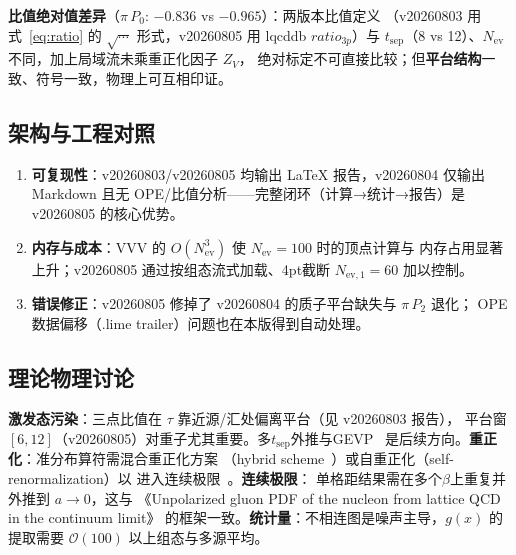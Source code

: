 \documentclass[11pt,a4paper]{article}
\newcommand{\Nev}{N_{\mathrm{ev}}}
\newcommand{\tsep}{t_{\mathrm{sep}}}
\begin{document}
\textbf{比值绝对值差异}（$\pi\,P_0$: $-0.836$ vs $-0.965$）：两版本比值定义
（v20260803 用式~\eqref{eq:ratio} 的 $\sqrt{\cdots}$ 形式，v20260805 用 lqcddb
$ratio_{3p}$）与 $\tsep$（8 vs 12）、$\Nev$ 不同，加上局域流未乘重正化因子 $Z_V$，
绝对标定不可直接比较；但\textbf{平台结构}一致、符号一致，物理上可互相印证。

\subsection{架构与工程对照}
\begin{enumerate}[leftmargin=*]
\item \textbf{可复现性}：v20260803/v20260805 均输出 LaTeX 报告，v20260804 仅输出
      Markdown 且无 OPE/比值分析——完整闭环（计算→统计→报告）是 v20260805 的核心优势。
\item \textbf{内存与成本}：VVV 的 $O(\Nev^3)$ 使 $\Nev=100$ 时的顶点计算与
      内存占用显著上升；v20260805 通过按组态流式加载、4pt截断 $N_{\mathrm{ev},1}=60$ 加以控制。
\item \textbf{错误修正}：v20260805 修掉了 v20260804 的质子平台缺失与 $\pi\,P_2$ 退化；
      OPE 数据偏移（.lime trailer）问题也在本版得到自动处理。
\end{enumerate}

\subsection{理论物理讨论}
\textbf{激发态污染}：三点比值在 $\tau$ 靠近源/汇处偏离平台（见 v20260803 报告），
平台窗 $[6,12]$（v20260805）对重子尤其重要。多$\tsep$外推与GEVP~\cite{blossier2009}
是后续方向。\textbf{重正化}：准分布算符需混合重正化方案
（hybrid scheme~\cite{hybrid-renorm}）或自重正化（self-renormalization）以
进入连续极限~\cite{selfrenorm-gluon,cont-limit}。\textbf{连续极限}：
单格距结果需在多个$\beta$上重复并外推到 $a\to0$，这与
《Unpolarized gluon PDF of the nucleon from lattice QCD in the continuum limit》
的框架一致。\textbf{统计量}：不相连图是噪声主导，$g(x)$ 的提取需要
$\mathcal{O}(100)$ 以上组态与多源平均。

\end{document}
